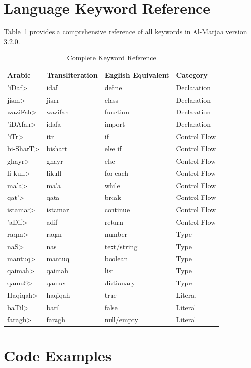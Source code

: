 \documentclass[11pt,a4paper]{article}
\begin{document}
\section{Language Keyword Reference}

Table~\ref{tab:all_keywords} provides a comprehensive reference of all keywords in Al-Marjaa version 3.2.0.

\begin{table}[h]
\centering
\caption{Complete Keyword Reference}
\label{tab:all_keywords}
\scriptsize
\begin{tabular}{@{}llll@{}}
\toprule
\textbf{Arabic} & \textbf{Transliteration} & \textbf{English Equivalent} & \textbf{Category} \\
\midrule
\<'iDaf> & idaf & define & Declaration \\
\<jism> & jism & class & Declaration \\
\<waziFah> & wazifah & function & Declaration \\
\<'iDAfah> & idafa & import & Declaration \\
\<'iTr> & itr & if & Control Flow \\
\<bi-SharT> & bishart & else if & Control Flow \\
\<ghayr> & ghayr & else & Control Flow \\
\<li-kull> & likull & for each & Control Flow \\
\<ma'a> & ma'a & while & Control Flow \\
\<qat'> & qata & break & Control Flow \\
\<istamar> & istamar & continue & Control Flow \\
\<'aDif> & adif & return & Control Flow \\
\<raqm> & raqm & number & Type \\
\<naS> & nas & text/string & Type \\
\<mantuq> & mantuq & boolean & Type \\
\<qaimah> & qaimah & list & Type \\
\<qamuS> & qamus & dictionary & Type \\
\<Haqiqah> & haqiqah & true & Literal \\
\<baTil> & batil & false & Literal \\
\<faragh> & faragh & null/empty & Literal \\
\bottomrule
\end{tabular}
\end{table}

\section{Code Examples}
\end{document}

